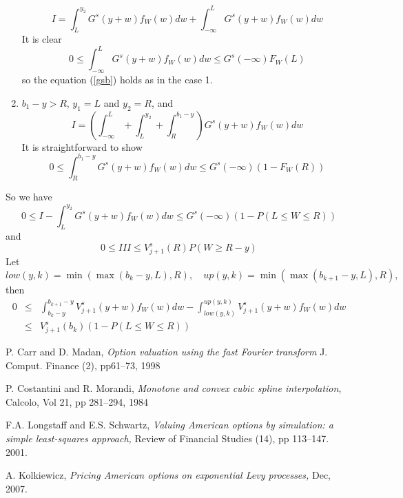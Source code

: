 \documentclass[numreferences]{kluwer}    %
\begin{document}
\begin{article}
\begin{enumerate}
\[
I=\int^{y_2}_L G^s(y+w)f_W(w)dw + \int^{L}_{-\infty}
G^s(y+w)f_W(w)dw
\]
It is clear
\[
0\le \int^{L}_{-\infty} G^s(y+w)f_W(w)dw\le G^s(-\infty) F_{W}(L)
\]
so the equation (\ref{gsb}) holds as in the case 1.
\item $b_1-y> R$, $y_1=L$ and $y_2=R$, and
\[
I=(\int^{L}_{-\infty}+\int^{y_2}_L +\int^{b_1-y}_{R})
G^s(y+w)f_W(w)dw
\]
It is straightforward to show
\[
0\le \int^{b_1-y}_{R} G^s(y+w)f_W(w)dw\le G^s(-\infty)(1-F_W(R))
\]
\end{enumerate}
So we have
\begin{equation}
0\le I-\int^{y_2}_{L}G^s(y+w)f_W(w)dw\le G^s(-\infty) (1-P(L\le W\le
R))
\end{equation}
and
\[
0\le III\le V^s_{j+1}(R)P(W\ge R-y)
\]
Let
\[
low(y,k)=\min(\max(b_k-y,L),R),\quad
up(y,k)=\min(\max(b_{k+1}-y,L),R),
\]
then
\begin{eqnarray*}
0&\le& \int^{b_{k+1}-y}_{b_k-y}V^s_{j+1}(y+w)f_W(w)dw-
\int^{up(y,k)}_{low(y,k)}V^s_{j+1}(y+w)f_W(w)dw\\
&\le& V_{j+1}^s(b_k)(1-P(L\le W\le R))
\end{eqnarray*}

\begin{thebibliography}{10}
P. Carr  and D. Madan,  \textit{Option valuation using the fast
Fourier transform} J. Comput. Finance (2), pp61--73, 1998

P. Costantini and R. Morandi, \textit{Monotone and convex cubic
spline interpolation}, Calcolo, Vol 21, pp 281--294, 1984

F.A. Longstaff and E.S. Schwartz, \textit{Valuing American options
by simulation: a simple least-squares approach,} Review of Financial
Studies (14), pp 113--147. 2001.

A. Kolkiewicz, \textit{Pricing American options on exponential Levy
processes,} Dec, 2007.
\end{thebibliography}


\end{article}
\end{document}
